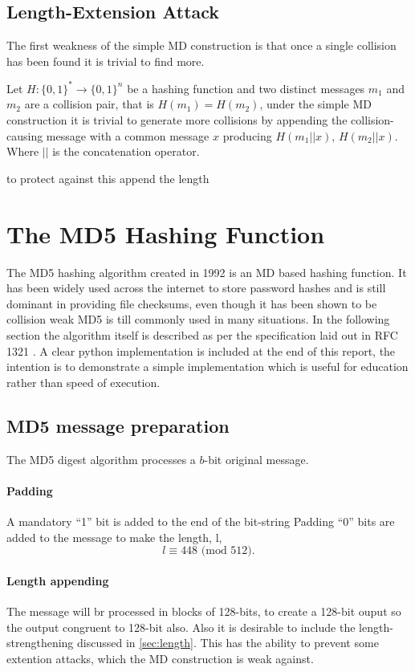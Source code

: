 \documentclass[a4paper,12pt]{article}
\begin{document}
\subsection{Length-Extension Attack}
The first weakness of the simple MD construction is that once a single collision has been found it is trivial to find more\cite{Sasaki2006}. 

Let $H: \{0,1\}^* \rightarrow \{0,1\}^n$ be a hashing function and two distinct messages $m_1$ and $m_2$ are a collision pair, that is $H(m_1) = H(m_2)$, under the simple MD construction it is trivial to generate more collisions by appending the collision-causing message with a common message $x$ producing $H(m_1||x)$, $H(m_2||x)$.  Where $||$ is the concatenation operator.

{\color{red} to protect against this append the length}
\label{sec:length}

\section{The MD5 Hashing Function}
The MD5 hashing algorithm\cite{Rivest} created in 1992 is an MD based hashing function. It has been widely used across the internet to store password hashes and is still dominant in providing file checksums, even though it has been shown to be collision weak MD5 is till commonly used in many situations. In the following section the algorithm itself is described as per the specification laid out in RFC 1321 \cite{Rivest}. A clear python implementation is included at the end of this report, the intention is to demonstrate a simple implementation which is useful for education rather than speed of execution.

\subsection{MD5 message preparation}
The MD5 digest algorithm processes a $b$-bit original message.
\paragraph{Padding}
\label{sec:md5pad}
A mandatory ``1'' bit is added to the end of the bit-string 
Padding ``0'' bits are added to the message to make the length, l, $$l \equiv 448 \text{ (mod } 512).$$

\paragraph{Length appending}
The message will br processed in blocks of 128-bits, to create a 128-bit ouput so the output congruent to 128-bit also. Also it is desirable to include the length-strengthening discussed in \ref{sec:length}. This has the ability to prevent some extention attacks, which the MD construction is weak against.
\end{document}
